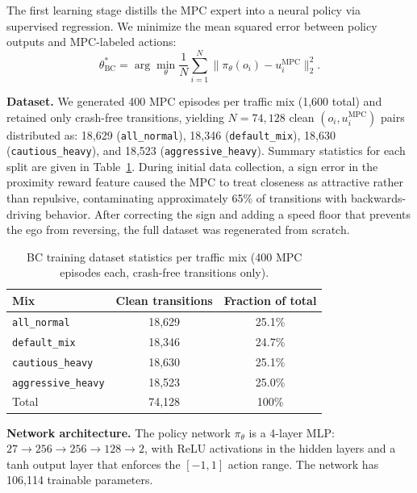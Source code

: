 \documentclass[conference]{IEEEtran}
\begin{document}
The first learning stage distills the MPC expert into a neural policy via
supervised regression.
We minimize the mean squared error between policy outputs and MPC-labeled
actions:
\begin{equation}
  \theta^*_{\text{BC}} = \arg\min_{\theta} \frac{1}{N} \sum_{i=1}^{N}
  \bigl\|\pi_\theta(o_i) - u_i^{\text{MPC}}\bigr\|_2^2.
  \label{eq:bc}
\end{equation}

\textbf{Dataset.}
We generated 400 MPC episodes per traffic mix (1,600 total) and retained
only crash-free transitions, yielding $N = 74{,}128$ clean
$(o_i, u_i^{\text{MPC}})$ pairs distributed as: 18,629 (\texttt{all\_normal}),
18,346 (\texttt{default\_mix}), 18,630 (\texttt{cautious\_heavy}), and 18,523
(\texttt{aggressive\_heavy}).
Summary statistics for each split are given in Table~\ref{tab:dataset}.
During initial data collection, a sign error in the proximity reward
feature caused the MPC to treat closeness as attractive rather than
repulsive, contaminating approximately 65\% of transitions with
backwards-driving behavior.
After correcting the sign and adding a speed floor that prevents the ego
from reversing, the full dataset was regenerated from scratch.

\begin{table}[t]
  \caption{BC training dataset statistics per traffic mix
    (400 MPC episodes each, crash-free transitions only).}
  \label{tab:dataset}
  \centering
  \begin{tabular}{lcc}
    \toprule
    Mix & Clean transitions & Fraction of total \\
    \midrule
    \texttt{all\_normal}       & 18,629 & 25.1\% \\
    \texttt{default\_mix}      & 18,346 & 24.7\% \\
    \texttt{cautious\_heavy}   & 18,630 & 25.1\% \\
    \texttt{aggressive\_heavy} & 18,523 & 25.0\% \\
    \midrule
    Total                    & 74,128 & 100\% \\
    \bottomrule
  \end{tabular}
\end{table}

\textbf{Network architecture.}
The policy network $\pi_\theta$ is a 4-layer MLP:
$27 \to 256 \to 256 \to 128 \to 2$, with ReLU activations in the hidden
layers and a tanh output layer that enforces the $[-1, 1]$ action range.
The network has 106,114 trainable parameters.
\end{document}

